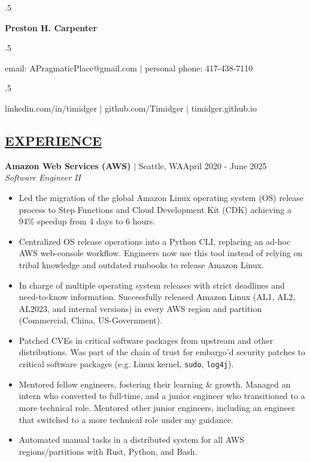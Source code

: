 \documentclass[overlapped,line]{res}
\begin{document}
\moveleft.5\hoffset\centerline{\huge\bf Preston H. Carpenter}
\vspace{.2em}

\moveleft.5\hoffset\centerline{email: APragmaticPlace@gmail.com $|$ personal phone: 417-438-7110}
\moveleft.5\hoffset\centerline{linkedin.com/in/timidger $|$ github.com/Timidger $|$ timidger.github.io }
\vspace{1em}

\begin{resume}

\section{\underline{EXPERIENCE}}

\textbf{Amazon Web Services (AWS)} $|$ Seattle, WA\hfill April 2020 - June 2025\\
{\sl Software Engineer II}
\begin{itemize} \itemsep -2pt
	\item Led the migration of the global Amazon Linux
		operating system (OS) release process to Step Functions and Cloud Development Kit
		(CDK) achieving a 94\% speedup from 4 days to 6 hours.
	\item Centralized OS release operations into a
		Python CLI, replacing an ad-hoc AWS web-console workflow.
		Engineers now use this tool instead of relying on tribal knowledge
		and outdated runbooks to release Amazon Linux.
	\item In charge of multiple operating system releases with strict
		deadlines and need-to-know information. Successfully released
		Amazon Linux (AL1, AL2, AL2023, and internal
		versions) in every AWS region and partition (Commercial, China,
		US-Government).
	\item Patched CVEs in critical software packages from upstream and other
		distributions. Was part of the chain of trust for embargo'd
		security patches to critical software packages (e.g.
		Linux kernel, \texttt{sudo}, \texttt{log4j}).
	\item Mentored fellow engineers, fostering their learning \& growth.
		Managed an intern who converted to full-time, and a junior
		engineer who transitioned to a more technical role.
		Mentored other junior engineers, including an engineer that
		switched to a more technical role under my guidance.
	\item Automated manual tasks in a distributed
		system for all AWS regions/partitions with
		Rust, Python, and Bash.
\end{itemize}


\end{resume}
\end{document}
